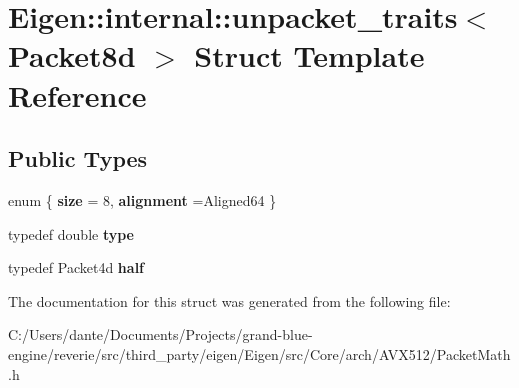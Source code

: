 \hypertarget{struct_eigen_1_1internal_1_1unpacket__traits_3_01_packet8d_01_4}{}\section{Eigen\+::internal\+::unpacket\+\_\+traits$<$ Packet8d $>$ Struct Template Reference}
\label{struct_eigen_1_1internal_1_1unpacket__traits_3_01_packet8d_01_4}
\subsection*{Public Types}
\begin{DoxyCompactItemize}
\item 
\mbox{\label{struct_eigen_1_1internal_1_1unpacket__traits_3_01_packet8d_01_4_ae089d6961b078e2d5662257225bd7c5b}} 
enum \{ {\bfseries size} = 8, 
{\bfseries alignment} =Aligned64
 \}
\item 
\mbox{\label{struct_eigen_1_1internal_1_1unpacket__traits_3_01_packet8d_01_4_ad8998aa524d7c65fa3f32ad74096cdbd}} 
typedef double {\bfseries type}
\item 
\mbox{\label{struct_eigen_1_1internal_1_1unpacket__traits_3_01_packet8d_01_4_ad8869b0890be804d26141d36b90aadcc}} 
typedef Packet4d {\bfseries half}
\end{DoxyCompactItemize}


The documentation for this struct was generated from the following file\+:\begin{DoxyCompactItemize}
\item 
C\+:/\+Users/dante/\+Documents/\+Projects/grand-\/blue-\/engine/reverie/src/third\+\_\+party/eigen/\+Eigen/src/\+Core/arch/\+A\+V\+X512/Packet\+Math.\+h\end{DoxyCompactItemize}
